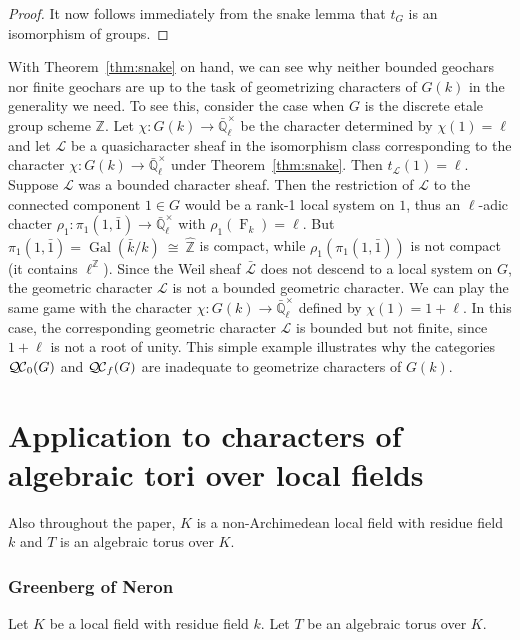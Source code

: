 \documentclass[11pt]{amsart}
\newcommand{\mathswab}[1]{\operatorname{\textswab{#1}}}
\theoremstyle{plain}
\theoremstyle{definition}
\theoremstyle{remark}
\newcommand{\ZZ}{{\mathbb{Z}}}
\newcommand{\EE}{\mathbb{\bar Q}_\ell}
\newcommand{\bFq}{\bar{k}}
\newcommand{\Fq}{k}
\newcommand{\EEx}{\EE^\times}
\DeclareMathOperator{\Gal}{Gal}
\newcommand{\Frob}[1]{{\operatorname{F}_{#1}}}
\newcommand{\iso}{{\ \cong\ }}
\newcommand{\GN}[1]{\mathswab{#1}}
\newcommand{\cs}[1]{{\mathcal{#1}}}
\newcommand{\gcs}[1]{{\mathcal{\bar #1}}}
\newcommand{\QC}{{\mathcal{Q\hskip-0.8pt C}}}
\newcommand{\QCb}{{\QC_0}}
\newcommand{\QCf}{{\QC_f}}
\newcommand{\trFrob}[1]{t_{#1}}
\begin{document}
\begin{proof}
  It now follows immediately from the snake lemma that $\trFrob{G}$ is an
  isomorphism of groups.
\end{proof}

With Theorem~\ref{thm:snake} on hand, we can see why neither bounded geochars nor finite geochars are up to the task of geometrizing characters of $G(\Fq)$ in the generality we need.  To see this, consider the case when $G$ is the discrete etale group scheme $\ZZ$. Let $\chi : G(\Fq) \to \EEx$ be the character determined by $\chi(1) = \ell$ and let $\cs{L}$ be a quasicharacter sheaf in the isomorphism class corresponding to the character $\chi : G(\Fq) \to \EEx$ under Theorem~\ref{thm:snake}. Then $\trFrob{\cs{L}}(1) = \ell$. Suppose $\cs{L}$ was a bounded character sheaf. Then the restriction of $\cs{L}$ to the connected component $1\in G$ would be a rank-1 local system on $1$, thus an $\ell$-adic chacter $\rho_1 : \pi_1(1,{\bar 1}) \to \EEx$ with $\rho_1(\Frob{\Fq}) = \ell$. But $\pi_1(1,{\bar 1}) = \Gal(\bFq/\Fq) \iso {\hat \ZZ}$ is compact, while $\rho_1(\pi_1(1,{\bar 1}))$ is not compact (it contains $\ell^\ZZ$). Since the Weil sheaf $\gcs{L}$ does not descend to a local system on $G$, the geometric character $\cs{L}$ is not a bounded geometric character. We can play the same game with the character $\chi : G(\Fq) \to \EEx$ defined by $\chi(1) = 1+\ell$. In this case, the corresponding geometric character $\cs{L}$ is bounded but not finite, since $1+\ell$ is not a root of unity. This simple example illustrates why the categories $\QCb(G)$ and $\QCf(G)$ are inadequate to geometrize characters of $G(\Fq)$.


\part{Application to characters of algebraic tori over local fields}

Also throughout the paper, $K$ is a non-Archimedean local field 
with residue field $\Fq$ and $T$ is an algebraic torus over $K$.

\section{Greenberg of Neron}
\label{sec:GN}

Let $K$ be a local field with residue field $\Fq$.
Let $T$ be an algebraic torus over $K$.

\end{document}
